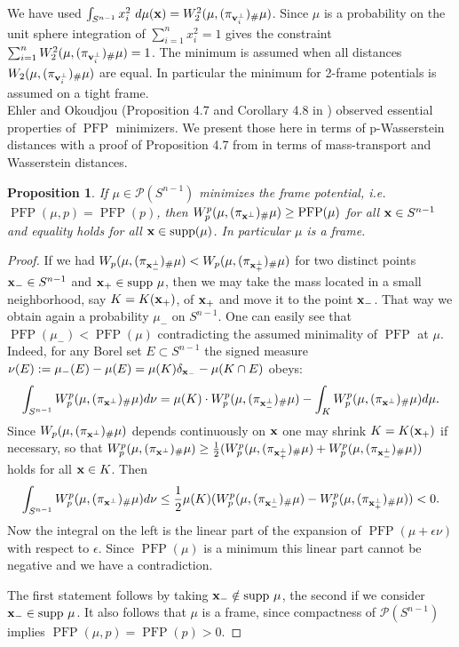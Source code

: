 \documentclass{amsart}
\numberwithin{equation}{section}
\newcommand\cP{{\mathcal P}}
\newcommand\PFP{{\operatorname{PFP}}}
\newcommand\supp{{\operatorname{supp}}}
\theoremstyle{plain}
\newtheorem{proposition}[subsection]{Proposition}
\theoremstyle{definition}
\begin{document}
We have used $ \int_{S^{n-1}} x_i^2 \ d\mu({\bf x}) = W^2_2(\mu, (\pi_{{\bf v}^{\perp}_i})_{\#}\mu)$. 
Since $\mu$ is a probability on the unit sphere integration of $\sum^n_{i=1}x^2_i=1$ gives the constraint $\sum^n_{i=1} W^2_2(\mu, (\pi_{{\bf v}^{\perp}_i})_{\#}\mu)=1$. The minimum is assumed when all distances $W_2(\mu, (\pi_{{\bf v}^{\perp}_i})_{\#}\mu)$ are equal. In particular the minimum for 2-frame potentials is assumed on a tight frame. \\
Ehler and Okoudjou (Proposition 4.7 and Corollary 4.8 in  \cite{ehler2012minimization}) observed essential properties of $\PFP$ minimizers. We present those here in terms of p-Wasserstein distances with a proof of Proposition 4.7 from \cite{ehler2012minimization} in terms of mass-transport and Wasserstein distances. 
\begin{proposition}\cite{ehler2012minimization}
If $\mu\in \cP(S^{n-1})$ minimizes the frame potential, i.e. $\PFP(\mu,p)= \PFP(p)$,  
then $ W^p_p(\mu, (\pi_{{\bf x}^{\perp}})_{\#}\mu)\geq \PFP(\mu)$ for all ${\bf x} \in S^{n-1}$ and equality holds for all ${\bf x} \in \supp(\mu)$. In particular $\mu$ is a frame. 
\end{proposition}
\begin{proof}
If we had $W_p(\mu, (\pi_{{\bf x}_-^{\perp}})_{\#}\mu)< W_p(\mu, (\pi_{{\bf x}_+^{\perp}})_{\#}\mu)$ for two distinct points ${\bf x}_- \in S^{n-1}$ and ${\bf x}_+ \in \supp\ \mu$, then we may take the mass located in a small neighborhood, say $K=K({\bf x}_+)$, of ${\bf x}_+$ and move it to the point ${\bf x}_-$. That way we obtain again a probability $\mu_-$ on $S^{n-1}$. One can easily see that $\PFP(\mu_-)< \PFP(\mu)$ contradicting the assumed minimality of $\PFP$ at $\mu$. 
Indeed, for any Borel set $E \subset S^{n-1}$ the signed measure $ \nu(E) :=\mu_-(E) -\mu(E) = \mu(K) \delta_{{\bf x}_-}-\mu(K \cap E)$  
obeys:  
$$ \int_{S^{n-1}} W^p_p(\mu, (\pi_{{\bf x}^{\perp}})_{\#}\mu)d\nu= \mu(K)\cdot W^p_p(\mu, (\pi_{{\bf x}^{\perp}_-})_{\#}\mu)-\int_{K} W^p_p(\mu, (\pi_{{\bf x}^{\perp}})_{\#}\mu)d\mu.
$$
Since $W_p(\mu, (\pi_{{\bf x}^{\perp}})_{\#}\mu)$ depends continuously on ${\bf x}$ one may shrink $K=K({\bf x}_+)$ if necessary, so that 
$W^p_p(\mu, (\pi_{{\bf x}^{\perp}})_{\#}\mu) \geq   \frac{1}{2}(W^p_p(\mu, (\pi_{{\bf x}^{\perp}_{+}})_{\#}\mu) + W^p_p(\mu, (\pi_{{\bf x}^{\perp}_{-}})_{\#}\mu)      ) $ holds for all ${\bf x} \in K$. Then 
$$ \int_{S^{n-1}} W^p_p(\mu, (\pi_{{\bf x}^{\perp}})_{\#}\mu)d\nu \leq \frac{1}{2}\mu(K)( W^p_p(\mu, (\pi_{{\bf x}^{\perp}_-})_{\#}\mu)- W^p_p(\mu, (\pi_{{\bf x}^{\perp}_{+}})_{\#}\mu) ) < 0.
$$
Now the integral on the left is the linear part of the expansion of $\PFP(\mu+\epsilon \nu)$ with respect to $\epsilon$. Since $\PFP(\mu)$ is a minimum 
this linear part cannot be negative and we have a contradiction. 

The first statement follows by taking ${\bf x}_- \notin \supp\ \mu$, the second if we consider 
${\bf x}_- \in \supp\ \mu$. It also follows that $\mu$ is a frame, since compactness of $\cP(S^{n-1})$ implies $\PFP(\mu,p)=\PFP(p)>0$. \end{proof}
\end{document}
